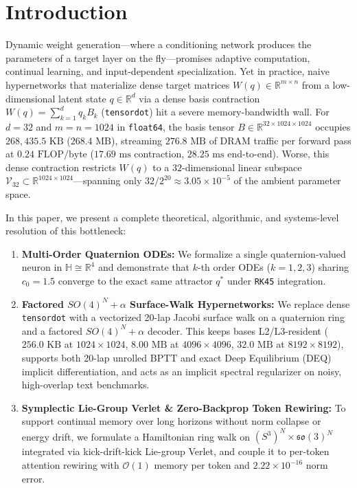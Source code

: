 \documentclass[11pt,twocolumn]{article}
\begin{document}
\section{Introduction}
Dynamic weight generation—where a conditioning network produces the parameters of a target layer on the fly—promises adaptive computation, continual learning, and input-dependent specialization. Yet in practice, naive hypernetworks that materialize dense target matrices $W(q) \in \mathbb{R}^{m \times n}$ from a low-dimensional latent state $q \in \mathbb{R}^d$ via a dense basis contraction $W(q) = \sum_{k=1}^d q_k B_k$ (\texttt{tensordot}) hit a severe memory-bandwidth wall. For $d=32$ and $m=n=1024$ in \texttt{float64}, the basis tensor $B \in \mathbb{R}^{32 \times 1024 \times 1024}$ occupies $268{,}435.5\text{ KB}$ ($268.4\text{ MB}$), streaming $276.8\text{ MB}$ of DRAM traffic per forward pass at $0.24\text{ FLOP/byte}$ ($17.69\text{ ms}$ contraction, $28.25\text{ ms}$ end-to-end). Worse, this dense contraction restricts $W(q)$ to a $32$-dimensional linear subspace $\mathcal{V}_{32} \subset \mathbb{R}^{1024 \times 1024}$—spanning only $32 / 2^{20} \approx 3.05 \times 10^{-5}$ of the ambient parameter space.

In this paper, we present a complete theoretical, algorithmic, and systems-level resolution of this bottleneck:
\begin{enumerate}
    \item \textbf{Multi-Order Quaternion ODEs:} We formalize a single quaternion-valued neuron in $\mathbb{H} \cong \mathbb{R}^4$ and demonstrate that $k$-th order ODEs ($k=1,2,3$) sharing $c_0 = 1.5$ converge to the exact same attractor $q^*$ under \texttt{RK45} integration.
    \item \textbf{Factored $SO(4)^N + \alpha$ Surface-Walk Hypernetworks:} We replace dense \texttt{tensordot} with a vectorized 20-lap Jacobi surface walk on a quaternion ring and a factored $SO(4)^N + \alpha$ decoder. This keeps bases L2/L3-resident ($256.0\text{ KB}$ at $1024\times 1024$, $8.00\text{ MB}$ at $4096\times 4096$, $32.0\text{ MB}$ at $8192\times 8192$), supports both 20-lap unrolled BPTT and exact Deep Equilibrium (DEQ) implicit differentiation, and acts as an implicit spectral regularizer on noisy, high-overlap text benchmarks.
    \item \textbf{Symplectic Lie-Group Verlet \& Zero-Backprop Token Rewiring:} To support continual memory over long horizons without norm collapse or energy drift, we formulate a Hamiltonian ring walk on $(S^3)^N \times \mathfrak{so}(3)^N$ integrated via kick-drift-kick Lie-group Verlet, and couple it to per-token attention rewiring with $\mathcal{O}(1)$ memory per token and $2.22 \times 10^{-16}$ norm error.
\end{enumerate}
\end{document}
